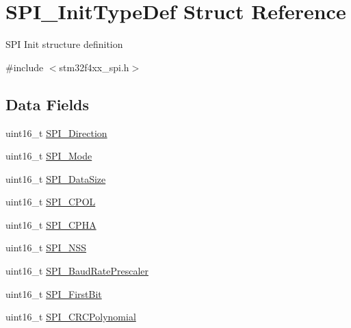 \hypertarget{struct_s_p_i___init_type_def}{}\section{S\+P\+I\+\_\+\+Init\+Type\+Def Struct Reference}
\label{struct_s_p_i___init_type_def}


S\+PI Init structure definition ~\newline
  




{\ttfamily \#include $<$stm32f4xx\+\_\+spi.\+h$>$}

\subsection*{Data Fields}
\begin{DoxyCompactItemize}
\item 
uint16\+\_\+t \mbox{\hyperlink{struct_s_p_i___init_type_def_a485dbba7798a7ff3d00dfabba19584b8}{S\+P\+I\+\_\+\+Direction}}
\item 
uint16\+\_\+t \mbox{\hyperlink{struct_s_p_i___init_type_def_aeddd33e224d56672843782c105ed82e4}{S\+P\+I\+\_\+\+Mode}}
\item 
uint16\+\_\+t \mbox{\hyperlink{struct_s_p_i___init_type_def_a541e4cbd533e4102ffeffbe8388a38d6}{S\+P\+I\+\_\+\+Data\+Size}}
\item 
uint16\+\_\+t \mbox{\hyperlink{struct_s_p_i___init_type_def_ae8d27aca088402c07e34e5a2ab4902d9}{S\+P\+I\+\_\+\+C\+P\+OL}}
\item 
uint16\+\_\+t \mbox{\hyperlink{struct_s_p_i___init_type_def_a120f808113ce7d69e2ec1ea65abed627}{S\+P\+I\+\_\+\+C\+P\+HA}}
\item 
uint16\+\_\+t \mbox{\hyperlink{struct_s_p_i___init_type_def_a046014c02b6456fd153ea81077e42ab6}{S\+P\+I\+\_\+\+N\+SS}}
\item 
uint16\+\_\+t \mbox{\hyperlink{struct_s_p_i___init_type_def_a35b348a0ba5d3e9a8bc907a7ebe10d13}{S\+P\+I\+\_\+\+Baud\+Rate\+Prescaler}}
\item 
uint16\+\_\+t \mbox{\hyperlink{struct_s_p_i___init_type_def_a5e5761d0b588ff75ad15adb2adf9e7e7}{S\+P\+I\+\_\+\+First\+Bit}}
\item 
uint16\+\_\+t \mbox{\hyperlink{struct_s_p_i___init_type_def_a1f0b3ef1e0062883db3ea3ef5690d0c2}{S\+P\+I\+\_\+\+C\+R\+C\+Polynomial}}
\end{DoxyCompactItemize}


